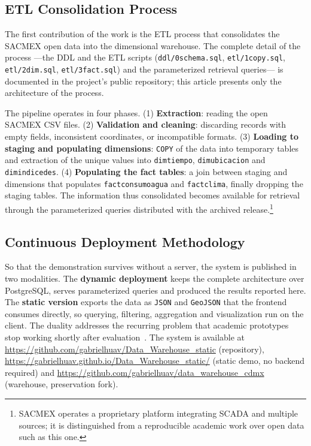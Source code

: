 \documentclass[runningheads]{llncs}
\newif\ifmarcarcambios
\newcommand{\icokg}[1]{\ifmarcarcambios\textcolor{nuevo}{#1}\else#1\fi}
\renewcommand{\_}{\origunderscore\allowbreak}
\begin{document}
\subsection{ETL Consolidation Process}

The first contribution of the work is the ETL process that consolidates the SACMEX open data into the dimensional warehouse. The complete detail of the process \icokg{---the DDL and the ETL scripts (\texttt{ddl/0\_schema.sql}, \texttt{etl/1\_copy.sql}, \texttt{etl/2\_dim.sql}, \texttt{etl/3\_fact.sql}) and the parameterized retrieval queries---} is documented in the project's public repository; this article presents only the architecture of the process.

The pipeline operates in four phases. (1) \textbf{Extraction}: reading the open SACMEX CSV files. (2) \textbf{Validation and cleaning}: discarding records with empty fields, inconsistent coordinates, or incompatible formats. (3) \textbf{Loading to staging and populating dimensions}: \texttt{COPY} of the data into temporary tables and extraction of the unique values into \icokg{\texttt{dim\_tiempo}, \texttt{dim\_ubicacion} and \texttt{dim\_indice\_des}}. (4) \textbf{Populating the fact tables}: a join between staging and dimensions \icokg{that populates \texttt{fact\_consumo\_agua} and \texttt{fact\_clima}}, finally dropping the staging tables. \icokg{The information thus consolidated becomes available for retrieval through the parameterized queries distributed with the archived release.}\footnote{SACMEX operates a proprietary platform integrating SCADA and multiple sources; it is distinguished from a reproducible academic work over open data such as this one.}


\subsection{Continuous Deployment Methodology}

So that the demonstration survives without a server, the system is published in
two modalities. The \textbf{dynamic deployment} keeps the complete architecture
\icokg{over PostgreSQL}, serves parameterized queries and produced the results
reported here. The \textbf{static version} exports the data as \texttt{JSON} and
\texttt{GeoJSON} that the frontend consumes directly, so querying, filtering,
aggregation and visualization run on the client.
\icokg{The duality addresses the recurring problem that academic prototypes stop
working shortly after evaluation~\cite{sandve2013,hill2023}.} The system is
available at \icokg{\url{https://github.com/gabrielhuav/Data_Warehouse_static}
(repository), \url{https://gabrielhuav.github.io/Data_Warehouse_static/} (static
demo, no backend required) and
\url{https://github.com/gabrielhuav/data_warehouse_cdmx} (warehouse,
preservation fork)}.
\end{document}
